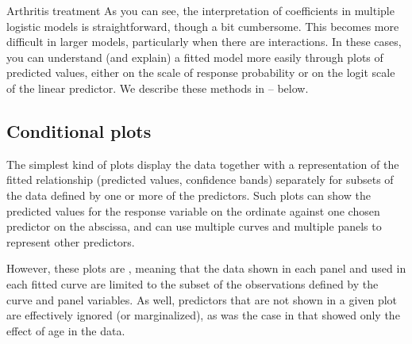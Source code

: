 \documentclass[11pt]{book}
\begin{document}
\begin{Example}{Arthritis treatment}
As you can see, the interpretation of coefficients in multiple logistic models
is straightforward, though a bit cumbersome.  This becomes more difficult in
larger models, particularly when there are interactions.  In these cases, 
you can understand (and explain) a fitted model more easily through plots of
predicted values, either on the scale of response probability or on the logit
scale of the linear predictor.  We describe these methods in 
-- below.

 
\end{Example}

\subsection{Conditional plots}\label{sec:condplots}
The simplest kind of plots display the data together with a representation
of the fitted relationship (predicted values, confidence bands) 
separately for subsets of the data defined by one or more of the predictors.
Such plots can show the predicted values for the response variable on the ordinate
against one chosen predictor on the abscissa, and can use multiple curves
and multiple panels to represent other predictors.

However, these plots are , meaning that the data 
shown in each panel and used in each fitted curve are limited to the subset
of the observations defined by the curve and panel variables.  As well, 
predictors that are not shown in a given plot are effectively ignored
(or marginalized), as was the case in 
that showed only the effect of age in the  data.
\end{document}
